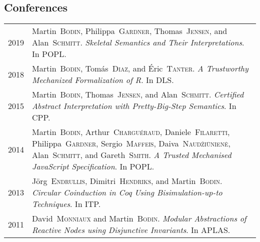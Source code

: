 \documentclass[12pt,a4paper]{article}
\makeatletter
\newenvironment{datecvsection}[1]%
               {\subsection*{#1}%
                 \noindent \begin{tabular}{@{}p{\annee}p{\texte}@{}}}
               {\end{tabular}}
\newcommand\familyName{\textsc}
\makeatother
\begin{document}
\begin{datecvsection}{Conferences}

  2019 & Martin~\familyName{Bodin}, Philippa~\familyName{Gardner}, Thomas~\familyName{Jensen}, and Alan~\familyName{Schmitt}. \textit{Skeletal Semantics and Their Interpretations}. In POPL. \\

  2018 & Martin~\familyName{Bodin}, Tomás~\familyName{Diaz}, and Éric~\familyName{Tanter}. \textit{A Trustworthy Mechanized Formalization of R}. In DLS. \\

  2015 & Martin~\familyName{Bodin}, Thomas~\familyName{Jensen}, and Alan~\familyName{Schmitt}. \textit{Certified Abstract Interpretation with Pretty-Big-Step Semantics}. In CPP. \\

  2014 & Martin~\familyName{Bodin}, Arthur~\familyName{Charguéraud}, Daniele~\familyName{Filaretti}, Philippa~\familyName{Gardner}, Sergio~\familyName{Maffeis}, Daiva~\familyName{Naudžiūnienė}, Alan~\familyName{Schmitt}, and Gareth~\familyName{Smith}. \textit{A Trusted Mechanised JavaScript Specification}. In POPL. \\

  2013 & Jörg~\familyName{Endrullis}, Dimitri~\familyName{Hendriks}, and Martin~\familyName{Bodin}. \textit{Circular Coinduction in Coq Using Bisimulation-up-to Techniques}. In ITP. \\

  2011 & David~\familyName{Monniaux} and Martin~\familyName{Bodin}. \textit{Modular Abstractions of Reactive Nodes using Disjunctive Invariants}. In APLAS. \\

\end{datecvsection}
\end{document}

